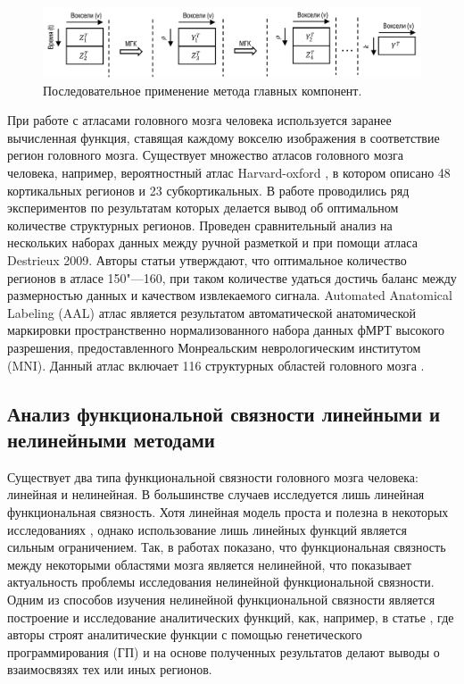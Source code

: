 \begin{figure}[ht]
    \centering
    \includegraphics[width=1.0\linewidth]{images/group_pca.pdf}
    \caption{Последовательное применение метода главных компонент.}\label{fig:group_pca}
\end{figure}

При работе с атласами головного мозга человека используется заранее вычисленная функция, ставящая каждому вокселю 
изображения в соответствие регион головного мозга. Существует множество атласов головного мозга человека, например, 
вероятностный атлас Harvard-oxford \cite{desikan2006automated}, в котором описано 48 кортикальных регионов и 
23 субкортикальных. В работе \cite{fischl2004automatically} проводились ряд экспериментов по результатам 
которых делается вывод об оптимальном количестве структурных регионов. Проведен сравнительный анализ на 
нескольких наборах данных между ручной разметкой и при помощи атласа Destrieux 2009. Авторы статьи утверждают, 
что оптимальное количество регионов в атласе 150"---160, при таком количестве удаться достичь баланс между 
размерностью данных и качеством извлекаемого сигнала. Automated Anatomical Labeling (AAL) атлас является 
результатом автоматической анатомической маркировки пространственно нормализованного набора данных фМРТ 
высокого разрешения, предоставленного Монреальским неврологическим институтом (MNI). Данный атлас 
включает 116 структурных областей головного мозга \cite{tzourio2002automated}.

 
\subsection{Анализ функциональной связности линейными и нелинейными методами}
Существует два типа функциональной связности головного мозга человека: линейная и нелинейная. В большинстве 
случаев исследуется лишь линейная функциональная связность. Хотя линейная модель проста и полезна в некоторых 
исследованиях \cite{soch2017improve, eklund2017bayesian, kovalev2017search}, однако использование лишь 
линейных функций является сильным ограничением. Так, в работах \cite{lahaye2003functional, karanikolas2016multi} 
показано, что функциональная связность между некоторыми областями мозга является нелинейной, что показывает 
актуальность проблемы исследования нелинейной функциональной связности. Одним из способов изучения нелинейной 
функциональной связности является построение и исследование аналитических функций, как, например, 
в статье \cite{allgaier2015nonlinear}, где авторы строят аналитические функции с помощью генетического 
программирования (ГП) и на основе полученных результатов делают выводы о взаимосвязях тех или иных регионов.


